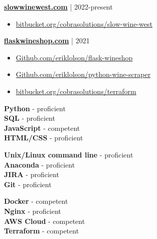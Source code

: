 \documentclass[9pt]{developercv} %
\begin{document}
\begin{minipage}[t]{0.45\textwidth}
	{\href{https://slowwinewest.com}{\bfseries slowwinewest.com}} | {2022-present}
		\begin{itemize}
   			\item {\href{https://bitbucket.org/cobrasolutions/slow-wine-west}{bitbucket.org/cobrasolutions/slow-wine-west}}
		\end{itemize}
\end{minipage}%
\hfill
\begin{minipage}[t]{0.45\textwidth}
		{\href{https://flaskwineshop.com}{\bfseries flaskwineshop.com}} | {2021}
            \begin{itemize}
                \item {\href{https://Github.com/eriklolson/flask-wineshop}{Github.com/eriklolson/flask-wineshop}}
                \item {\href{https://Github.com/eriklolson/python-wine-scraper}{Github.com/eriklolson/python-wine-scraper}}
                \item {\href{https://bitbucket.org/cobrasolutions/terraform}{bitbucket.org/cobrasolutions/terraform}}
            \end{itemize}
            
\end{minipage}%
	\vspace{44pt}
\begin{minipage}[t]{0.3\textwidth}
	\vspace{-\baselineskip} %
	\textbf{Python} - proficient\\
	\textbf{SQL} - proficient\\
	\textbf{JavaScript} - competent\\
	\textbf{HTML/CSS} - proficient\\
\end{minipage}
\hfill
\begin{minipage}[t]{0.3\textwidth}
	\vspace{-\baselineskip} %
	\textbf{Unix/Linux command line} - proficient\\
	\textbf{Anaconda} - proficient\\
	\textbf{JIRA} - proficient\\
	\textbf{Git} - proficient\\
\end{minipage}
\hfill
\begin{minipage}[t]{0.3\textwidth}
	\vspace{-\baselineskip} %
	\textbf{Docker} - competent\\
	\textbf{Nginx} - proficient\\
	\textbf{AWS Cloud} - competent\\
	\textbf{Terraform} - competent\\
\end{minipage}
\end{document}
